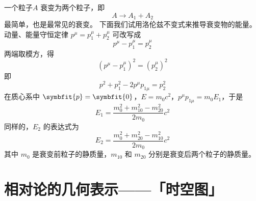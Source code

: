 一个粒子$A$ 衰变为两个粒子，即
\begin{equation}
    A \to A_1 + A_2
\end{equation}
最简单，也是最常见的衰变。
下面我们试用洛伦兹不变式来推导衰变物的能量。
动量、能量守恒定律 $p^\mu = p_1^\mu + p_2^\mu$ 可改写成
\begin{equation}
    p^\mu - p_1^\mu = p_2^\mu
\end{equation}
两端取模方，得
\begin{equation}
    (p^\mu - p_1^\mu)^2 = (p_2^\mu)^2
\end{equation}
即
\begin{equation}
    p^2 + p_1^2 - 2 p^\mu p_{1\mu} = p_2^2
\end{equation}
在质心系中 $\symbfit{p} = \symbfit{0}$，$E = m_0 c^2$，$p^\mu p_{1\mu} = m_0 E_1$，于是
\begin{equation}
    E_1 = \frac{m_0^2 + m_{10}^2 - m_{20}^2}{2 m_0} c^2
\end{equation}
同样的，$E_2$ 的表达式为
\begin{equation}
    E_2 = \frac{m_0^2 + m_{20}^2 - m_{10}^2}{2 m_0} c^2
\end{equation}
其中 $m_0$ 是衰变前粒子的静质量，$m_{10}$ 和 $m_{20}$ 分别是衰变后两个粒子的静质量。

\section{相对论的几何表示——「时空图」}

\



